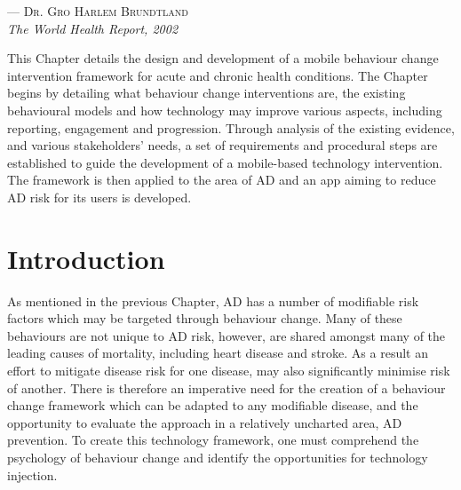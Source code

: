  \label{chapter: prevention-framework}

\setlength{\epigraphwidth}{.50\textwidth}
\begin{epigraphs}
{--- \textsc{Dr. Gro Harlem Brundtland} \\ \textit{The World Health Report, 2002}}
\end{epigraphs}

This Chapter details the design and development of a mobile behaviour change intervention framework for acute and chronic health conditions. The Chapter begins by detailing what behaviour change interventions are, the existing behavioural models and how technology may improve various aspects, including reporting, engagement and progression. Through analysis of the existing evidence, and various stakeholders' needs, a set of requirements and procedural steps are established to guide the development of a mobile-based technology intervention.
The framework is then applied to the area of AD and an app aiming to reduce AD risk for its users is developed.

\section{Introduction}
As mentioned in the previous Chapter, AD has a number of modifiable risk factors which may be targeted through behaviour change. Many of these behaviours are not unique to AD risk, however, are shared amongst many of the leading causes of mortality, including heart disease and stroke. As a result an effort to mitigate disease risk for one disease, may also significantly minimise risk of another. There is therefore an imperative need for the creation of a behaviour change framework which can be adapted to any modifiable disease, and the opportunity to evaluate the approach in a relatively uncharted area, AD prevention. To create this technology framework, one must comprehend the psychology of behaviour change and identify the opportunities for technology injection.

